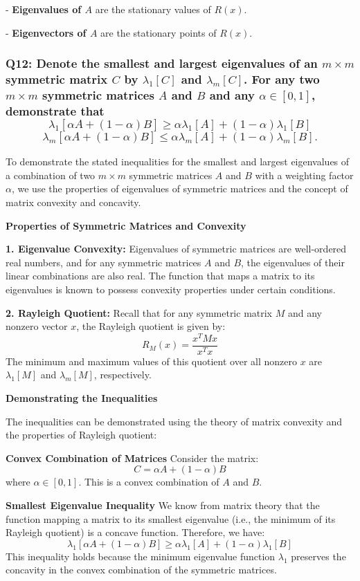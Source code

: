 \documentclass[8pt]{article}
\begin{document}
- \textbf{Eigenvalues of \(A\)} are the stationary values of \(R(x)\).

- \textbf{Eigenvectors of \(A\)} are the stationary points of \(R(x)\).


\subsubsection*{Q12: Denote the smallest and largest eigenvalues of an \(m \times m\) symmetric matrix \(C\) by \(\lambda_1[C]\) and \(\lambda_m[C]\). For any two \(m \times m\) symmetric matrices \(A\) and \(B\) and any \(\alpha \in [0, 1]\), demonstrate that
\[
\lambda_1[\alpha A + (1 - \alpha)B] \geq \alpha \lambda_1[A] + (1 - \alpha) \lambda_1[B]
\]
\[
\lambda_m[\alpha A + (1 - \alpha)B] \leq \alpha \lambda_m[A] + (1 - \alpha) \lambda_m[B].
\]
}

To demonstrate the stated inequalities for the smallest and largest eigenvalues of a combination of two \(m \times m\) symmetric matrices \(A\) and \(B\) with a weighting factor \(\alpha\), we use the properties of eigenvalues of symmetric matrices and the concept of matrix convexity and concavity.

\textbf{Properties of Symmetric Matrices and Convexity}

\textbf{1. Eigenvalue Convexity:}
   Eigenvalues of symmetric matrices are well-ordered real numbers, and for any symmetric matrices \(A\) and \(B\), the eigenvalues of their linear combinations are also real. The function that maps a matrix to its eigenvalues is known to possess convexity properties under certain conditions.

\textbf{2. Rayleigh Quotient:}
   Recall that for any symmetric matrix \(M\) and any nonzero vector \(x\), the Rayleigh quotient is given by:
   \[
   R_M(x) = \frac{x^T M x}{x^T x}
   \]
   The minimum and maximum values of this quotient over all nonzero \(x\) are \(\lambda_1[M]\) and \(\lambda_m[M]\), respectively.

\textbf{Demonstrating the Inequalities}

The inequalities can be demonstrated using the theory of matrix convexity and the properties of Rayleigh quotient:

\textbf{Convex Combination of Matrices}
Consider the matrix:
\[
C = \alpha A + (1 - \alpha) B
\]
where \(\alpha \in [0, 1]\). This is a convex combination of \(A\) and \(B\).

\textbf{Smallest Eigenvalue Inequality}
We know from matrix theory that the function mapping a matrix to its smallest eigenvalue (i.e., the minimum of its Rayleigh quotient) is a concave function. Therefore, we have:
\[
\lambda_1[\alpha A + (1 - \alpha) B] \geq \alpha \lambda_1[A] + (1 - \alpha) \lambda_1[B]
\]
This inequality holds because the minimum eigenvalue function \(\lambda_1\) preserves the concavity in the convex combination of the symmetric matrices.
\end{document}
